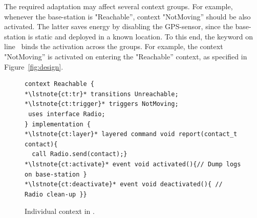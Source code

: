 The required adaptation may affect several context groups. For example, whenever
the base-station is "Reachable'', context "NotMoving'' should be also activated.
The latter saves energy by disabling the GPS-sensor, since the base-station is
static and deployed in a known location. To this end, the keyword
 on line~ binds the activation across the
groups. For example, the context "NotMoving'' is activated on entering the
"Reachable'' context, as specified in Figure~\ref{fig:design}.


\begin{figure}[!tb]
\begin{lstlisting}[style=conescframe]
context Reachable {
*\lstnote{ct:tr}* transitions Unreachable;
*\lstnote{ct:trigger}* triggers NotMoving;
 uses interface Radio;
} implementation {
*\lstnote{ct:layer}* layered command void report(contact_t contact){
  call Radio.send(contact);}
*\lstnote{ct:activate}* event void activated(){// Dump logs on base-station }
*\lstnote{ct:deactivate}* event void deactivated(){ // Radio clean-up }}
\end{lstlisting}
\caption{Individual context in \conesc.}
  \label{fig:context}
\vspace{-5mm}
\end{figure}
